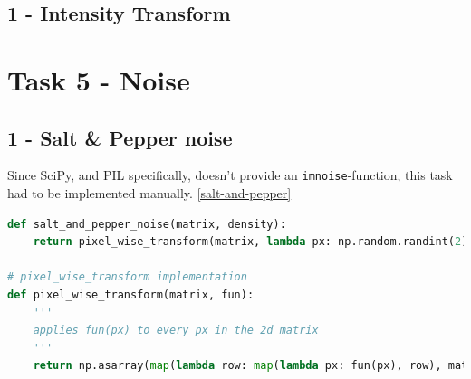 \subsection*{1 - Intensity Transform}

%

\section*{Task 5 - Noise}

\subsection*{1 - Salt \& Pepper noise}

Since SciPy, and PIL specifically, doesn't provide an \texttt{imnoise}-function, this task had to be implemented manually. \ref{salt-and-pepper}

\begin{lstlisting}[language=Python, label=salt-and-pepper, caption=Salt \& pepper noise]
def salt_and_pepper_noise(matrix, density):
    return pixel_wise_transform(matrix, lambda px: np.random.randint(2) if np.random.random() < density else px)

# pixel_wise_transform implementation
def pixel_wise_transform(matrix, fun):
    '''
    applies fun(px) to every px in the 2d matrix
    '''
    return np.asarray(map(lambda row: map(lambda px: fun(px), row), matrix))
\end{lstlisting}

